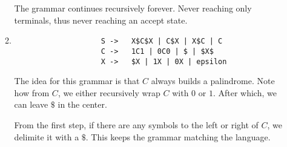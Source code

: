 \documentclass{article}
\begin{document}
\begin{enumerate}
\begin{enumerate}
                The grammar continues recursively forever.
                Never reaching only terminals, thus never reaching an accept state.
            \item
                \begin{lstlisting}
                    S ->   X$C$X | C$X | X$C | C
                    C ->   1C1 | 0C0 | $ | $X$
                    X ->   $X | 1X | 0X | epsilon
                \end{lstlisting}

                The idea for this grammar is that $C$ always builds a palindrome.
                Note how from $C$, we either recursively wrap $C$ with $0$ or $1$.
                After which, we can leave $\$$ in the center.

                From the first step, if there are any symbols to the left or right of $C$, we delimite it with a $\$$.
                This keeps the grammar matching the language.


\end{enumerate}
\end{enumerate}
\end{document}
